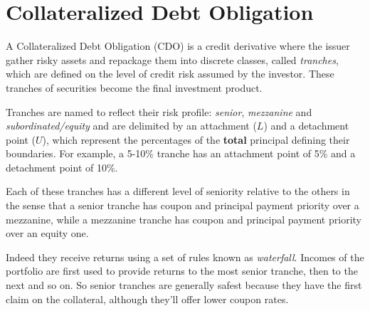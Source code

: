 %
%
%
%
%

\section{Collateralized Debt Obligation}
\label{collateralized-debt-obligation}

A Collateralized Debt Obligation (CDO) is a credit derivative where the issuer gather risky assets and repackage them into discrete classes, called \emph{tranches}, which are defined on the level of credit risk assumed by the investor. These tranches of securities become the final investment product.

Tranches are named to reflect their risk profile: \emph{senior}, \emph{mezzanine} and \emph{subordinated/equity} and are delimited by an attachment ($L$) and a detachment point ($U$), which represent the percentages of the \textbf{total} principal defining their boundaries. For example, a 5-10\% tranche has an attachment point of 5\% and a detachment point of 10\%. 

Each of these tranches has a different level of seniority relative to the others in the sense that a senior tranche has coupon and principal payment priority over a mezzanine, while a mezzanine tranche has coupon and principal payment priority over an equity one. 

Indeed they receive returns using a set of rules known as \emph{waterfall}. Incomes of the portfolio are first used to provide returns to the most senior tranche, then to the next and so on. So senior tranches are generally safest because they have the first claim on the collateral, although they'll offer lower coupon rates.

